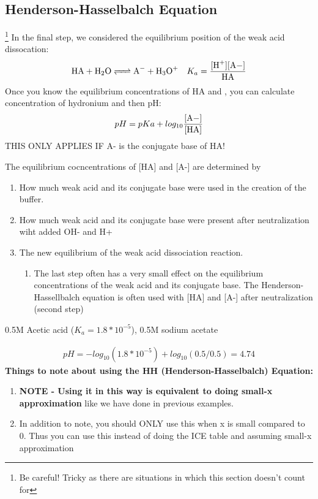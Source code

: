 \documentclass[../CHEM152Notes.tex]{subfiles}
\begin{document}
\subsection*{Henderson-Hasselbalch Equation}\footnote{Be careful! Tricky as there are situations in which this section doesn't count for}
In the final step, we considered the equilibrium position of the weak acid dissocation:
\begin{equation*}
    \begin{aligned}
        \ce{HA + H2O <=> A- + H3O+} \quad K_a = \ce{\frac{[H+][A-]}{HA}} 
    \end{aligned}
\end{equation*}
Once you know the equilibrium concentrations of HA and , you can calculate concentration of hydronium and then pH:
\begin{equation*}
    \begin{aligned}
        pH = pKa + log_{10}\ce{\frac{[A-]}{[HA]}}
    \end{aligned}
\end{equation*}
THIS ONLY APPLIES IF A- is the conjugate base of HA!

The equilibrium cocncentrations of [HA] and [A-] are determined by 
\begin{enumerate}
    \item How much weak acid and its conjugate base were used in the creation of the buffer.
    \item How much weak acid and its conjugate base were present after neutralization wiht added OH- and H+
    \item The new equilibrium of the weak acid dissociation reaction.
    \begin{enumerate}
        \item The last step often has a very small effect on the equilibrium concentrations of the weak acid and its conjugate base. The Henderson-Hassellbalch equation is often used with [HA] and [A-] after neutralization (second step) 
    \end{enumerate}
\end{enumerate}
\begin{exmp}
    0.5M Acetic acid ($K_a = 1.8*10^{-5}$), 0.5M sodium acetate
\end{exmp}
\begin{equation*}
    \begin{aligned}
        pH = -log_{10}(1.8*10^{-5}) + log_{10}(0.5/0.5) = 4.74
    \end{aligned}
\end{equation*}
\textbf{Things to note about using the HH (Henderson-Hasselbalch) Equation:}
\begin{enumerate}
    \item \textbf{NOTE - Using it in this way is equivalent to doing small-x approximation} like we have done in previous examples.
    \item In addition to note, you should ONLY use this when x is small compared to 0. Thus you can use this instead of doing the ICE table and assuming small-x approximation
\end{enumerate}
\end{document}
